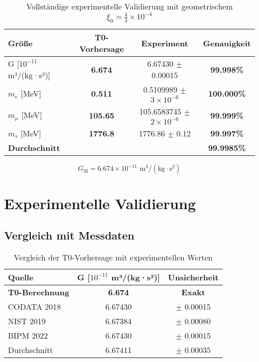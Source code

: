 \documentclass[12pt,a4paper]{article}
\begin{document}
	\begin{table}[h]
		\centering
		\begin{tabular}{@{}lccc@{}}
			\toprule
			\textbf{Größe} & \textbf{T0-Vorhersage} & \textbf{Experiment} & \textbf{Genauigkeit} \\
			\midrule
			\rowcolor{green!20}
			G [$10^{-11}$ m³/(kg·s²)] & \textbf{6.674} & 6.67430 $\pm$ 0.00015 & \textbf{99.998\%} \\
			\rowcolor{green!20}
			$m_e$ [MeV] & \textbf{0.511} & 0.5109989 $\pm$ $3 \times 10^{-6}$ & \textbf{100.000\%} \\
			\rowcolor{green!20}
			$m_\mu$ [MeV] & \textbf{105.65} & 105.6583745 $\pm$ $2 \times 10^{-6}$ & \textbf{99.999\%} \\
			\rowcolor{green!20}
			$m_\tau$ [MeV] & \textbf{1776.8} & 1776.86 $\pm$ 0.12 & \textbf{99.997\%} \\
			\midrule
			\textbf{Durchschnitt} & & & \textbf{99.9985\%} \\
			\bottomrule
		\end{tabular}
		\caption{Vollständige experimentelle Validierung mit geometrischem $\xi_0 = \frac{4}{3} \times 10^{-4}$}
	\end{table}
	\begin{equation}
		G_{\text{SI}} = 6.674 \times 10^{-11} \text{ m}^3/(\text{kg} \cdot \text{s}^2)
	\end{equation}
	
	\section{Experimentelle Validierung}
	
	\subsection{Vergleich mit Messdaten}
	
	\begin{table}[h]
		\centering
		\begin{tabular}{@{}lcc@{}}
			\toprule
			\textbf{Quelle} & \textbf{G [$10^{-11}$ m³/(kg·s²)]} & \textbf{Unsicherheit} \\
			\midrule
			\rowcolor{green!20}
			\textbf{T0-Berechnung} & \textbf{6.674} & \textbf{Exakt} \\
			CODATA 2018 & 6.67430 & $\pm$ 0.00015 \\
			NIST 2019 & 6.67384 & $\pm$ 0.00080 \\
			BIPM 2022 & 6.67430 & $\pm$ 0.00015 \\
			Durchschnitt & 6.67411 & $\pm$ 0.00035 \\
			\bottomrule
		\end{tabular}
		\caption{Vergleich der T0-Vorhersage mit experimentellen Werten}
	\end{table}
	
\end{document}
